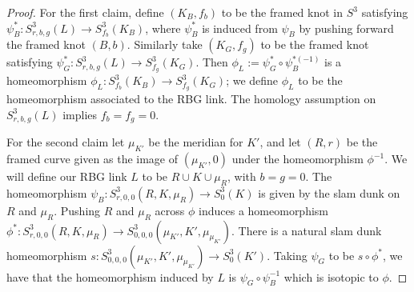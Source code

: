 \documentclass [11pt]{amsart}
\theoremstyle{remark}
\begin{document}
\begin{proof}
For the first claim, define $(K_B, f_b)$ to be the framed knot in $S^3$ satisfying $\psi_B^*:S^3_{r,b,g}(L)\to S^3_{f_b}(K_B)$, where $\psi_B^*$ is induced from $\psi_B$ by pushing forward the framed knot $(B,b)$. Similarly take $(K_G, f_g)$ to be the framed knot satisfying $\psi_G^*:S^3_{r,b,g}(L)\to S^3_{f_g}(K_G)$. Then $\phi_L:= \psi_G^*\circ \psi_B^{*(-1)}$ is a homeomorphism $\phi_L:S^3_{f_b}(K_B)\to S^3_{f_g}(K_G)$; we define $\phi_L$ to be the homeomorphism associated to the RBG link.  The homology assumption on $S^3_{r,b,g}(L)$ implies $f_b=f_g=0$. 

For the second claim let $\mu_{K'}$ be the meridian for $K'$, and let $(R,r)$ be the framed curve given as the image of $(\mu_{K'}, 0)$ under the homeomorphism $\phi^{-1}$.  We will define our RBG link $L$ to be $R\cup K\cup \mu_R$, with $b=g=0$. The homeomorphism $\psi_B: S^3_{r,0,0}(R,K,\mu_R)\to S^3_0(K)$ is given by the slam dunk on $R$ and $\mu_R$.  Pushing $R$ and $\mu_R$ across $\phi$ induces a homeomorphism $\phi^*: S^3_{r,0,0}(R,K,\mu_R)\to S^3_{0,0,0}(\mu_{K'},K',\mu_{\mu_{K'}})$.  There is a natural slam dunk homeomorphism $s:S^3_{0,0,0}(\mu_{K'},K',\mu_{\mu_{K'}})\to S^3_0(K')$. Taking $\psi_G$ to be $s\circ \phi^*$, we have that the homeomorphism induced by $L$ is $\psi_G\circ\psi_B^{-1}$ which is isotopic to $\phi$.
\end{proof}
\end{document}
